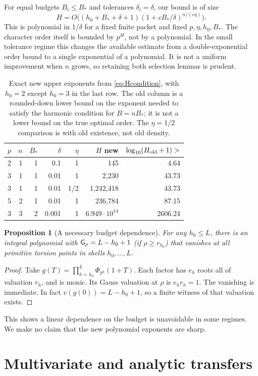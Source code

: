 \documentclass[11pt]{article}
\newtheorem{proposition}[theorem]{Proposition}
\theoremstyle{remark}\newtheorem{remark}[theorem]{Remark}
\begin{document}
For equal budgets $B_i\le B_*$ and tolerances $\delta_i=\delta$, our
bound is of size
\[
 H=O\big((h_0+B_*+\delta+1)
              (1+cB_*/\delta)^{n/(c\eta)}\big).
\]
This is polynomial in $1/\delta$ for a fixed finite packet and fixed
$p,\eta,h_0,B_*$. The character order itself is bounded by $p^H$,
not by a polynomial. In the small tolerance regime this changes the
available estimate from a double-exponential order bound to a
single exponential of a polynomial. It is not a uniform improvement
when $n$ grows, so retaining both selection lemmas is prudent.

\begin{table}[ht]
\centering\small
\begin{tabular}{rrrrrrr}
\toprule
$p$ & $n$ & $B_*$ & $\delta$ & $\eta$ & $H$ new & $\log_{10}(H_{\rm old}+1)>$\\
\midrule
2&1&1&0.1&1&145&4.64\\
3&1&1&0.01&1&2,230&43.73\\
3&1&1&0.01&1/2&1,242,418&43.73\\
5&2&1&0.01&1&236,784&87.15\\
3&3&2&0.001&1&$6.949\cdot10^{14}$&2606.24\\
\bottomrule
\end{tabular}
\caption{Exact new upper exponents from \eqref{eq:Hcondition}, with
$h_0=2$ except $h_0=3$ in the last row. The old column is a rounded-down
lower bound on the exponent needed to satisfy the harmonic condition for
$B=nB_*$; it is not a lower bound on the true optimal order. The
$\eta=1/2$ comparison is with old existence, not old density.}
\end{table}

\begin{proposition}[A necessary budget dependence]\label{prop:lower}
For any $h_0\le L$, there is an integral polynomial with
$\mathsf G_\rho=L-h_0+1$ (if $\rho\ge r_{h_0}$) that vanishes at all
primitive torsion points in shells $h_0,\ldots,L$.
\end{proposition}
\begin{proof}
Take $g(T)=\prod_{h=h_0}^{L}\Phi_{p^h}(1+T)$. Each factor has
$e_h$ roots all of valuation $r_h$, and is monic. Its Gauss valuation
at $\rho$ is $e_hr_h=1$. The vanishing is immediate. In fact
$v(g(0))=L-h_0+1$, so a finite witness of that valuation exists.
\end{proof}
This shows a linear dependence on the budget is unavoidable in some
regimes. We make no claim that the new polynomial exponents are sharp.
\section{Multivariate and analytic transfers}
\end{document}

